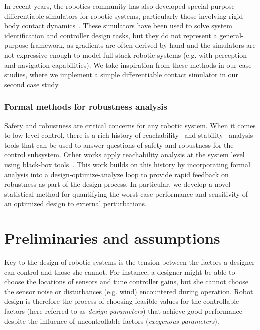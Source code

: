 In recent years, the robotics community has also developed special-purpose differentiable simulators for robotic systems, particularly those involving rigid body contact dynamics~\cite{heiden2021neuralsim,belubute_peres_lcp_physics,drake,suh2021_bundled_gradients}. These simulators have been used to solve system identification and controller design tasks, but they do not represent a general-purpose framework, as gradients are often derived by hand and the simulators are not expressive enough to model full-stack robotic systems (e.g. with perception and navigation capabilities). We take inspiration from these methods in our case studies, where we implement a simple differentiable contact simulator in our second case study.

\subsubsection{Formal methods for robustness analysis}

Safety and robustness are critical concerns for any robotic system. When it comes to low-level control, there is a rich history of reachability~\cite{althoff_reachability_review} and stability~\cite{changNeuralLyapunovControl2019,dawsonSafeNonlinearControl2022} analysis tools that can be used to answer questions of safety and robustness for the control subsystem.
Other works apply reachability analysis at the system level using black-box tools~\cite{fan_dryvr}. This work builds on this history by incorporating formal analysis into a design-optimize-analyze loop to provide rapid feedback on robustness as part of the design process. In particular, we develop a novel statistical method for quantifying the worst-case performance and sensitivity of an optimized design to external perturbations.

\section{Preliminaries and assumptions}\label{ch:rss:prelim}

Key to the design of robotic systems is the tension between the factors a designer can control and those she cannot. For instance, a designer might be able to choose the locations of sensors and tune controller gains, but she cannot choose the sensor noise or disturbances (e.g. wind) encountered during operation.
Robot design is therefore the process of choosing feasible values for the controllable factors (here referred to as \textit{design parameters}) that achieve good performance despite the influence of uncontrollable factors (\textit{exogenous parameters}).

